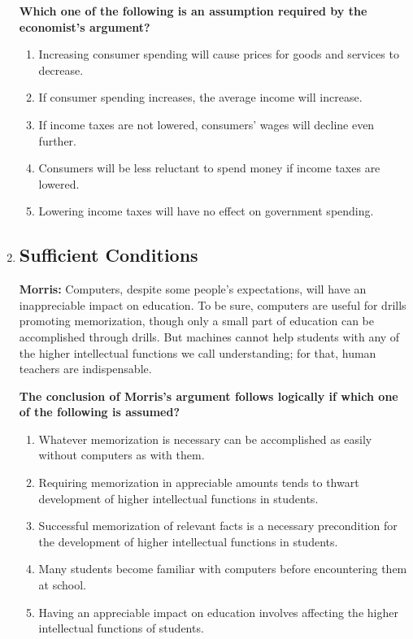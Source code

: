 \documentclass[9pt]{article}
\begin{document}
\begin{multicols}{3}
\begin{enumerate}
 

\noindent
\textbf{Which one of the following is an assumption required by the economist’s argument?}

\begin{enumerate}[label=(\alph*)]
    \item Increasing consumer spending will cause prices for goods and services to decrease.
    \item If consumer spending increases, the average income will increase.
    \item If income taxes are not lowered, consumers' wages will decline even further.
    \item Consumers will be less reluctant to spend money if income taxes are lowered.
    \item Lowering income taxes will have no effect on government spending.
\end{enumerate}

\item
\subsection*{Sufficient Conditions}
\noindent
\textbf{Morris:} Computers, despite some people's expectations, will have an inappreciable impact on education. To be sure, computers are useful for drills promoting memorization, though only a small part of education can be accomplished through drills. But machines cannot help students with any of the higher intellectual functions we call understanding; for that, human teachers are indispensable.


\noindent
\textbf{The conclusion of Morris's argument follows logically if which one of the following is assumed?}

\begin{enumerate}[label=(\alph*)]
    \item Whatever memorization is necessary can be accomplished as easily without computers as with them.
    \item Requiring memorization in appreciable amounts tends to thwart development of higher intellectual functions in students.
    \item Successful memorization of relevant facts is a necessary precondition for the development of higher intellectual functions in students.
    \item Many students become familiar with computers before encountering them at school.
    \item Having an appreciable impact on education involves affecting the higher intellectual functions of students.
\end{enumerate}
\end{enumerate}
\end{multicols}
\end{document}
